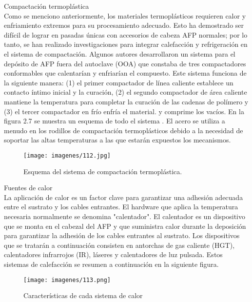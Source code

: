 Compactación termoplástica\\
Como se menciono anteriormente, los materiales termoplásticos requieren calor y enfriamiento extremos para su procesamiento adecuado. Esto ha demostrado ser difícil de lograr en pasadas únicas con accesorios de cabeza AFP normales; por lo tanto, se han realizado investigaciones para integrar calefacción y refrigeración en el sistema de compactación. Algunos autores desarrollaron un sistema para el depósito de AFP fuera del autoclave (OOA) que constaba de tres compactadores conformables que calentarían y enfriarían el compuesto. Este sistema funciona de la siguiente manera: (1) el primer compactador de línea caliente establece un contacto íntimo inicial y la curación, (2) el segundo compactador de área caliente mantiene la temperatura para completar la curación de las cadenas de polímero y (3) el tercer compactador en frío enfría el material. y comprime los vacíos. En la figura 2.7 se muestra un esquema de todo el sistema . El acero se utiliza a menudo en los rodillos de compactación termoplásticos debido a la necesidad de soportar las altas temperaturas a las que estarán expuestos los mecanismos.
\begin{figure}[H]
\begin{center}
\texttt{[image: imagenes/112.jpg]}
\caption{Esquema del sistema de compactación termoplástica.}
\label{afp}
\end{center}
\end{figure}

Fuentes de calor\\
La aplicación de calor es un factor clave para garantizar una adhesión adecuada entre el sustrato y los cables entrantes. El hardware que aplica la temperatura necesaria normalmente se denomina "calentador". El calentador es un dispositivo que se monta en el cabezal del AFP y que suministra calor durante la deposición para garantizar la adhesión de los cables entrantes al sustrato. Los dispositivos que se tratarán a continuación consisten en antorchas de gas caliente (HGT), calentadores infrarrojos (IR), láseres y calentadores de luz pulsada. Estos sistemas de calefacción se resumen a continuación en la siguiente figura.
\begin{figure}[H]
\begin{center}
\texttt{[image: imagenes/113.png]}
\caption{Características de cada sistema de calor}
\label{afp}
\end{center}
\end{figure}

